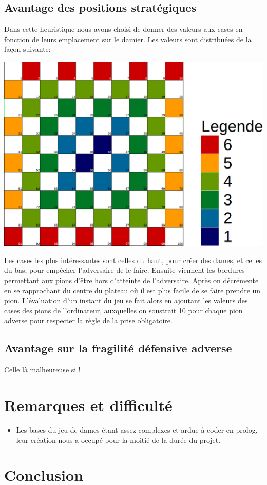 \documentclass[10pt,a4paper]{report}
\begin{document}
	\subsection{Avantage des positions stratégiques}
		Dans cette heuristique nous avons choisi de donner des valeurs aux cases en fonction de leurs emplacement sur le damier. Les valeurs sont distribuées de la façon suivante:
		\begin{center}
			\includegraphics[scale=0.2]{valeursDamier.png}
		\end{center}
		Les cases les plus intéressantes sont celles du haut, pour créer des dames, et celles du bas, pour empêcher l'adversaire de le faire. Ensuite viennent les bordures permettant aux pions d'être hors d'atteinte de l'adversaire. Après on décrémente en se rapprochant du centre du plateau où il est plus facile de se faire prendre un pion.
		L'évaluation d'un instant du jeu se fait alors en ajoutant les valeurs des cases des pions de l'ordinateur, auxquelles on soustrait 10 pour chaque pion adverse pour respecter la règle de la prise obligatoire.
	\subsection{Avantage sur la fragilité défensive adverse }
	Celle là malheureuse si !
\section{Remarques et difficulté}
	\begin{itemize}
		\item Les bases du jeu de dames étant assez complexes et ardue à coder en prolog, leur création nous a occupé pour la moitié de la durée du projet.
	\end{itemize}
	
\section{Conclusion}
\end{document}
